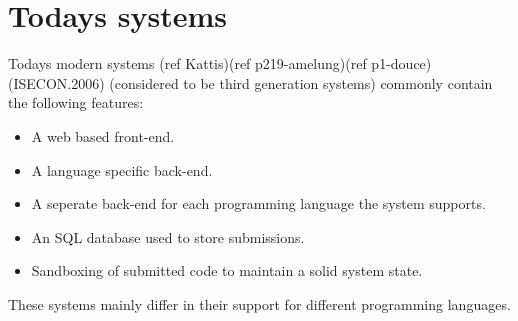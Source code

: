 \section{Todays systems} \label{sec:todays_systems}
Todays modern systems (ref Kattis)(ref p219-amelung)(ref p1-douce)(ISECON.2006) (considered to be third generation systems) commonly contain the following features:
\begin{itemize}
	\item A web based front-end.
	\item A language specific back-end.
	\item A seperate back-end for each programming language the system supports.
	\item An SQL database used to store submissions.
	\item Sandboxing of submitted code to maintain a solid system state. 
\end{itemize}
These systems mainly differ in their support for different programming languages.